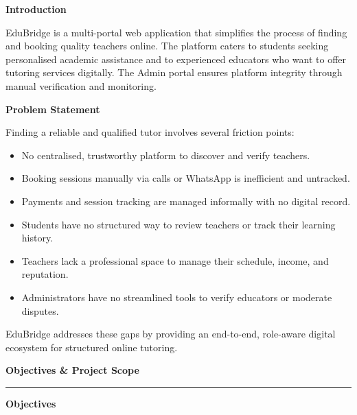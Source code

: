 \documentclass[12pt,a4paper]{report}
\begin{document}
\vspace{0.4cm}
\textbf{Introduction}

\vspace{0.2cm}
EduBridge is a multi-portal web application that simplifies the process of finding and booking quality teachers online. The platform caters to students seeking personalised academic assistance and to experienced educators who want to offer tutoring services digitally. The Admin portal ensures platform integrity through manual verification and monitoring.

\vspace{0.5cm}
\textbf{Problem Statement}

\vspace{0.2cm}
Finding a reliable and qualified tutor involves several friction points:

\begin{itemize}[leftmargin=1.5em, itemsep=2pt]
    \item No centralised, trustworthy platform to discover and verify teachers.
    \item Booking sessions manually via calls or WhatsApp is inefficient and untracked.
    \item Payments and session tracking are managed informally with no digital record.
    \item Students have no structured way to review teachers or track their learning history.
    \item Teachers lack a professional space to manage their schedule, income, and reputation.
    \item Administrators have no streamlined tools to verify educators or moderate disputes.
\end{itemize}

\vspace{0.4cm}
EduBridge addresses these gaps by providing an end-to-end, role-aware digital ecosystem for structured online tutoring.

\newpage
\thispagestyle{plain}
{\large\bfseries Objectives \& Project Scope}\\[0.6pt]
\rule{\textwidth}{0.6pt}

\vspace{0.4cm}
\textbf{Objectives}
\end{document}
